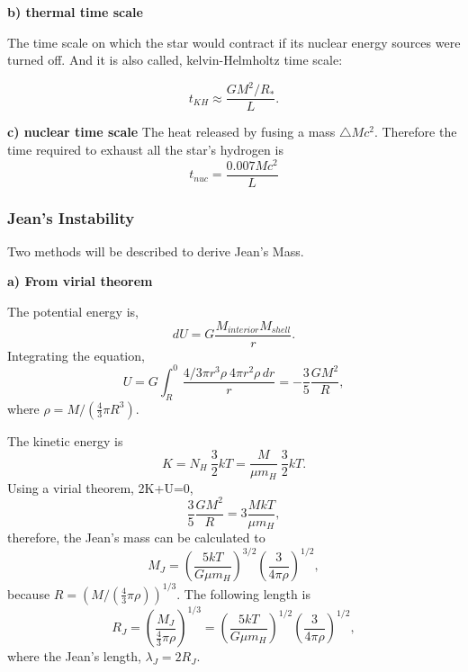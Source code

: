 \textbf{b) thermal time scale}

The time scale on which the star would contract if its nuclear energy sources were turned off. And 
it is also called, kelvin-Helmholtz time scale:

\begin{equation}
   t_{KH} \approx \frac{G M^{2}/R_{*}}{L}.
\end{equation}

\textbf{c) nuclear time scale}
The heat released by fusing a mass $\triangle M c^{2}$. Therefore the time required to exhaust all the star's 
hydrogen is
\begin{equation}
   t_{nuc} = \frac{0.007 M c^{2}}{L}
\end{equation}

\subsubsection{Jean's Instability}\label{subsubsec:Jean}

Two methods will be described to derive Jean's Mass.

\textbf{a) From virial theorem}

The potential energy is,
\begin{equation}
   dU = G \frac{M_{interior}M_{shell}}{r}.
\end{equation}
Integrating the equation, 
\begin{equation}
   U = G \int^{0}_{R} \frac{4/3\pi r^{3}\rho ~4\pi r^{2} \rho\,dr}{r} = -\frac{3}{5} \frac{G M^{2}}{R},
\end{equation}
where $\rho = M / (\frac{4}{3}\pi R^{3})$.

The kinetic energy is
\begin{equation}
   K = N_{H}~\frac{3}{2}kT = \frac{M}{\mu m_{H}}~\frac{3}{2}kT.
\end{equation}
Using a virial theorem, 2K+U=0,
\begin{equation}
   \frac{3}{5}\frac{G M^{2}}{R} = 3 \frac{M k T}{\mu m_{H}},
\end{equation}
therefore, the Jean's mass can be calculated to
\begin{equation}
   M_{J} = \left( \frac{5 k T}{G\mu m_{H}} \right)^{3/2} \left( \frac{3}{4\pi \rho} \right)^{1/2},
\end{equation}
because $R=\left( M/(\frac{4}{3}\pi \rho) \right)^{1/3}$. The following length is
\begin{equation}
   R_{J} = \left( \frac{M_{J}}{\frac{4}{3}\pi\rho} \right)^{1/3} = \left( \frac{5 k T}{G\mu m_{H}} \right)^{1/2} \left( \frac{3}{4\pi\rho} \right)^{1/2},
\end{equation}
where the Jean's length, $\lambda_{J} = 2 R_{J}$.

